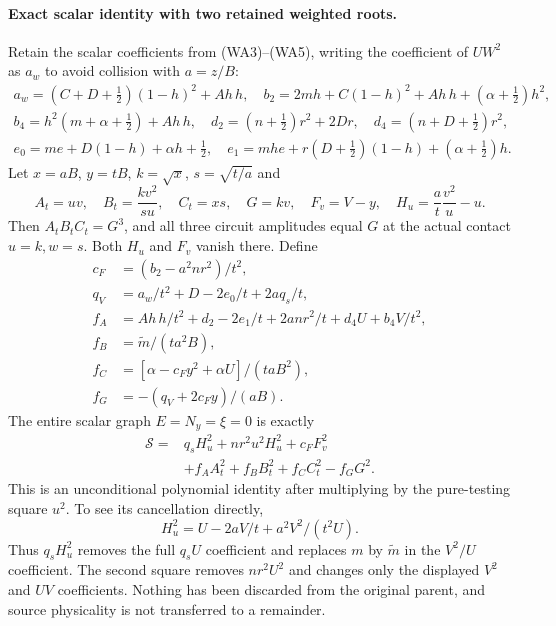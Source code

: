 \paragraph{Exact scalar identity with two retained weighted roots.}
Retain the scalar coefficients from (WA3)--(WA5), writing the
coefficient of $U W^2$ as $a_w$ to avoid collision with $a=z/B$:
\[
\begin{gathered}
 a_w=(C+D+\tfrac12)(1-h)^2+Ah\,h,\quad
 b_2=2mh+C(1-h)^2+Ah\,h+(\alpha+\tfrac12)h^2,\\
 b_4=h^2(m+\alpha+\tfrac12)+Ah\,h,\quad
 d_2=(n+\tfrac12)r^2+2Dr,\quad d_4=(n+D+\tfrac12)r^2,\\
 e_0=me+D(1-h)+\alpha h+\tfrac12,\quad
 e_1=mhe+r(D+\tfrac12)(1-h)+(\alpha+\tfrac12)h.
\end{gathered}                                                \tag{WC6}
\]
Let $x=aB$, $y=tB$, $k=\sqrt x$, $s=\sqrt{t/a}$ and
\[
 A_t=uv,\quad B_t=\frac{k v^2}{su},\quad C_t=xs,
 \quad G=kv,\quad F_v=V-y,\quad
 H_u=\frac a t\frac{v^2}u-u.
                                                               \tag{WC7}
\]
Then $A_tB_tC_t=G^3$, and all three circuit amplitudes equal $G$
at the actual contact $u=k,w=s$. Both $H_u$ and $F_v$ vanish
there. Define
\[
\begin{aligned}
 c_F&=(b_2-a^2nr^2)/t^2,\\
 q_V&=a_w/t^2+D-2e_0/t+2aq_s/t,\\
 f_A&=Ah\,h/t^2+d_2-2e_1/t+2anr^2/t+d_4U+b_4V/t^2,\\
 f_B&=\widetilde m/(ta^2B),\\
 f_C&=[\alpha-c_Fy^2+\alpha U]/(taB^2),\\
 f_G&=-(q_V+2c_Fy)/(aB).
\end{aligned}                                                    \tag{WC8}
\]
The entire scalar graph $E=N_y=\xi=0$ is exactly
\[
\begin{aligned}
 \mathcal S={}&q_sH_u^2+nr^2u^2H_u^2+c_FF_v^2\\
 &+f_AA_t^2+f_BB_t^2+f_CC_t^2-f_GG^2.             
\end{aligned} \tag{WC9}
\]
This is an unconditional polynomial identity after multiplying by
the pure-testing square $u^2$. To see its cancellation directly,
\[
 H_u^2=U-2aV/t+a^2V^2/(t^2U).
\]
Thus $q_sH_u^2$ removes the full $q_sU$ coefficient and replaces
$m$ by $\widetilde m$ in the $V^2/U$ coefficient. The second
square removes $nr^2U^2$ and changes only the displayed $V^2$ and
$UV$ coefficients. Nothing has been discarded from the original
parent, and source physicality is not transferred to a remainder.

